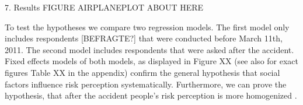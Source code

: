 



7. Results 
FIGURE AIRPLANEPLOT ABOUT HERE

To test the hypotheses we compare two regression models. The first model only includes respondents [BEFRAGTE?] that were conducted before March 11th, 2011. The second model includes respondents that were asked after the accident.   
Fixed effects models of both models, as displayed in Figure XX (see also for exact figures Table XX in the appendix) confirm the general hypothesis that social factors influence risk perception systematically. Furthermore, we can prove the hypothesis, that after the accident people's risk perception is more homogenized .   


